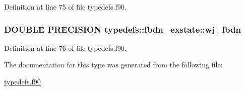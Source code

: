 Definition at line 75 of file typedefs.f90.\hypertarget{typetypedefs_1_1fbdn__exstate_aaf62d1b6e41c831990923a8e0ca14373}{
\subsubsection[{wj\_\-fbdn}]{\setlength{\rightskip}{0pt plus 5cm}DOUBLE PRECISION {\bf typedefs::fbdn\_\-exstate::wj\_\-fbdn}}}
\label{typetypedefs_1_1fbdn__exstate_aaf62d1b6e41c831990923a8e0ca14373}


Definition at line 76 of file typedefs.f90.

The documentation for this type was generated from the following file:\begin{DoxyCompactItemize}
\item 
\hyperlink{typedefs_8f90}{typedefs.f90}\end{DoxyCompactItemize}
